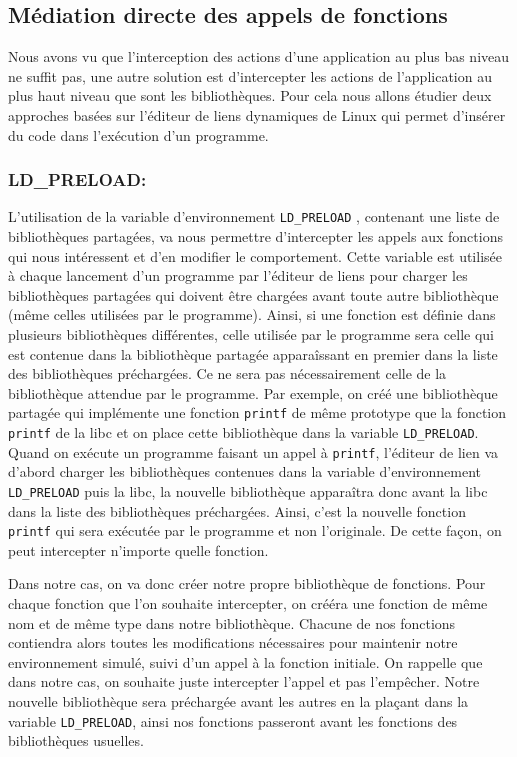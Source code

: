\subsection{Médiation directe des appels de fonctions}

Nous avons vu que l'interception des actions d'une application au plus bas
niveau ne suffit pas, une autre solution est d'intercepter les actions de
l'application au plus haut niveau que sont les bibliothèques. Pour cela nous
allons étudier deux approches basées sur l'éditeur de liens dynamiques de Linux
qui permet d'insérer du code dans l'exécution d'un programme.

\subsubsection{LD\_PRELOAD:}
\label{paragraphe:LDPreload}

L'utilisation de la variable d'environnement \texttt{LD\_PRELOAD}
\citep{LDPreload}, contenant une liste de bibliothèques partagées, va nous
permettre d'intercepter les appels aux fonctions qui nous intéressent et d'en
modifier le comportement. Cette variable est utilisée à chaque lancement d'un
programme par l'éditeur de liens pour charger les bibliothèques partagées qui
doivent être chargées avant toute autre bibliothèque (même celles utilisées par
le programme). Ainsi, si une fonction est définie dans plusieurs bibliothèques
différentes, celle utilisée par le programme sera celle qui est contenue dans la
bibliothèque partagée apparaîssant en premier dans la liste des bibliothèques
préchargées. Ce ne sera pas nécessairement celle de la bibliothèque
attendue par le programme. Par exemple, on créé une bibliothèque partagée qui
implémente une fonction \texttt{printf} de même prototype que la
fonction \texttt{printf} de la libc et on place cette bibliothèque dans la
variable \texttt{LD\_PRELOAD}. Quand on exécute un programme faisant un appel
à \texttt{printf}, l'éditeur de lien va d'abord charger les bibliothèques
contenues dans la variable d'environnement \texttt{LD\_PRELOAD} puis la libc, la
nouvelle bibliothèque apparaîtra donc avant la libc dans la liste des
bibliothèques préchargées. Ainsi, c'est la nouvelle fonction \texttt{printf}
qui sera exécutée par le programme et non l'originale. De cette façon, on peut
intercepter n'importe quelle fonction.

Dans notre cas, on va donc créer notre propre bibliothèque de fonctions. Pour
chaque fonction que l'on souhaite intercepter, on crééra une
fonction de même nom et de même type dans notre bibliothèque. Chacune de nos
fonctions contiendra alors toutes les modifications nécessaires pour maintenir
notre environnement simulé, suivi d'un appel à la fonction initiale. On rappelle
que dans notre cas, on souhaite juste intercepter l'appel et pas l'empêcher. Notre nouvelle bibliothèque sera préchargée avant les autres en la plaçant dans
la variable \texttt{LD\_PRELOAD}, ainsi nos fonctions passeront avant les
fonctions des bibliothèques usuelles.


